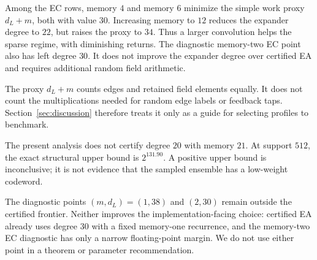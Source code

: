 Among the EC rows, memory $4$ and memory $6$ minimize the simple work proxy
$d_L+m$, both with value $30$.  Increasing memory to $12$ reduces the
expander degree to $22$, but raises the proxy to $34$.  Thus a larger
convolution helps the sparse regime, with diminishing returns.  The
diagnostic memory-two EC point also has left degree $30$.  It does not improve
the expander degree over certified EA and requires additional random field
arithmetic.

The proxy $d_L+m$ counts edges and retained field elements equally.  It does
not count the multiplications needed for random edge labels or feedback taps.
Section~\ref{sec:discussion} therefore treats it only as a guide for selecting
profiles to benchmark.

The present analysis does not certify degree $20$ with memory $21$.  At
support $512$, the exact structural upper bound is $2^{131.90}$.  A positive
upper bound is inconclusive; it is not evidence that the sampled ensemble has
a low-weight codeword.

The diagnostic points $(m,d_L)=(1,38)$ and $(2,30)$ remain outside the
certified frontier.  Neither improves the implementation-facing choice:
certified EA already uses degree $30$ with a fixed memory-one recurrence, and
the memory-two EC diagnostic has only a narrow floating-point margin.  We do
not use either point in a theorem or parameter recommendation.
